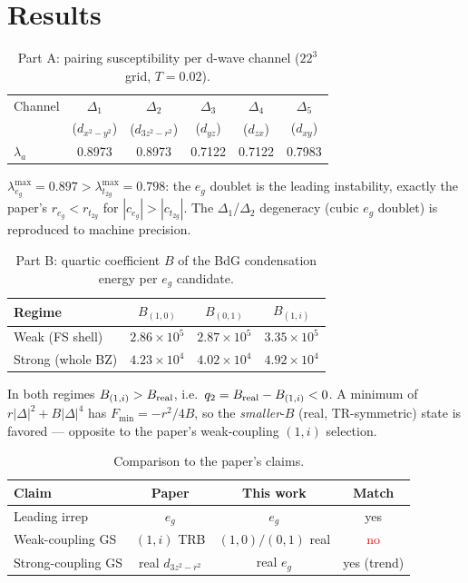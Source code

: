 \documentclass[11pt]{article}
\begin{document}
\section{Results}
\begin{table}[h]\centering
\caption{Part A: pairing susceptibility per d-wave channel ($22^3$ grid, $T=0.02$).}
\begin{tabular}{lccccc}
\toprule
Channel & $\Delta_1$ & $\Delta_2$ & $\Delta_3$ & $\Delta_4$ & $\Delta_5$ \\
 & ($d_{x^2-y^2}$) & ($d_{3z^2-r^2}$) & ($d_{yz}$) & ($d_{zx}$) & ($d_{xy}$) \\
\midrule
$\lambda_a$ & 0.8973 & 0.8973 & 0.7122 & 0.7122 & 0.7983 \\
\bottomrule
\end{tabular}
\end{table}

$\lambda_{e_g}^{\max}=0.897 > \lambda_{t_{2g}}^{\max}=0.798$: the $e_g$ doublet is the leading
instability, exactly the paper's $r_{e_g}<r_{t_{2g}}$ for $|c_{e_g}|>|c_{t_{2g}}|$. The $\Delta_1$/$\Delta_2$
degeneracy (cubic $e_g$ doublet) is reproduced to machine precision.

\begin{table}[h]\centering
\caption{Part B: quartic coefficient $B$ of the BdG condensation energy per $e_g$ candidate.}
\begin{tabular}{lccc}
\toprule
Regime & $B_{(1,0)}$ & $B_{(0,1)}$ & $B_{(1,i)}$ \\
\midrule
Weak (FS shell) & $2.86\times10^5$ & $2.87\times10^5$ & $3.35\times10^5$ \\
Strong (whole BZ) & $4.23\times10^4$ & $4.02\times10^4$ & $4.92\times10^4$ \\
\bottomrule
\end{tabular}
\end{table}

In both regimes $B_{(1,i)}>B_{\rm real}$, i.e.\ $q_2=B_{\rm real}-B_{(1,i)}<0$. A minimum of
$r|\Delta|^2+B|\Delta|^4$ has $F_{\min}=-r^2/4B$, so the \emph{smaller}-$B$ (real, TR-symmetric)
state is favored --- opposite to the paper's weak-coupling $(1,i)$ selection.

\begin{table}[h]\centering
\caption{Comparison to the paper's claims.}
\begin{tabular}{lccc}
\toprule
Claim & Paper & This work & Match \\
\midrule
Leading irrep & $e_g$ & $e_g$ & \textcolor{green!60!black}{yes} \\
Weak-coupling GS & $(1,i)$ TRB & $(1,0)/(0,1)$ real & \textcolor{red}{no} \\
Strong-coupling GS & real $d_{3z^2-r^2}$ & real $e_g$ & \textcolor{green!60!black}{yes (trend)} \\
\bottomrule
\end{tabular}
\end{table}
\end{document}
